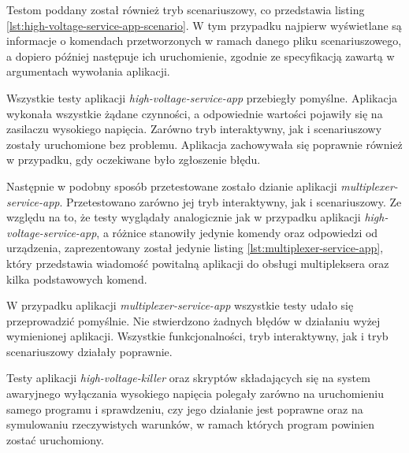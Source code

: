 Testom poddany został również tryb scenariuszowy, co przedstawia listing \ref{lst:high-voltage-service-app-scenario}. W tym przypadku najpierw wyświetlane są informacje o komendach przetworzonych w ramach danego pliku scenariuszowego, a dopiero później następuje ich uruchomienie, zgodnie ze specyfikacją zawartą w argumentach wywołania aplikacji.



Wszystkie testy aplikacji \emph{high-voltage-service-app} przebiegły pomyślne. Aplikacja wykonała wszystkie żądane czynności, a odpowiednie wartości pojawiły się na zasilaczu wysokiego napięcia. Zarówno tryb interaktywny, jak i scenariuszowy zostały uruchomione bez problemu. Aplikacja zachowywała się poprawnie również w przypadku, gdy oczekiwane było zgłoszenie błędu.

Następnie w podobny sposób przetestowane zostało dzianie aplikacji \emph{multiplexer-service-app}. Przetestowano zarówno jej tryb interaktywny, jak i scenariuszowy. Ze względu na to, że testy wyglądały analogicznie jak w przypadku aplikacji \emph{high-voltage-service-app}, a różnice stanowiły jedynie komendy oraz odpowiedzi od urządzenia, zaprezentowany został jedynie listing \ref{lst:multiplexer-service-app}, który przedstawia wiadomość powitalną aplikacji do obsługi multipleksera oraz kilka podstawowych komend.

\clearpage


W przypadku aplikacji \emph{multiplexer-service-app} wszystkie testy udało się przeprowadzić pomyślnie. Nie stwierdzono żadnych błędów w działaniu wyżej wymienionej aplikacji. Wszystkie funkcjonalności, tryb interaktywny, jak i tryb scenariuszowy działały poprawnie.

\clearpage
Testy aplikacji \emph{high-voltage-killer} oraz skryptów składających się na system awaryjnego wyłączania wysokiego napięcia polegały zarówno na uruchomieniu samego programu i sprawdzeniu, czy jego działanie jest poprawne oraz na symulowaniu rzeczywistych warunków, w ramach których program powinien zostać uruchomiony. 

